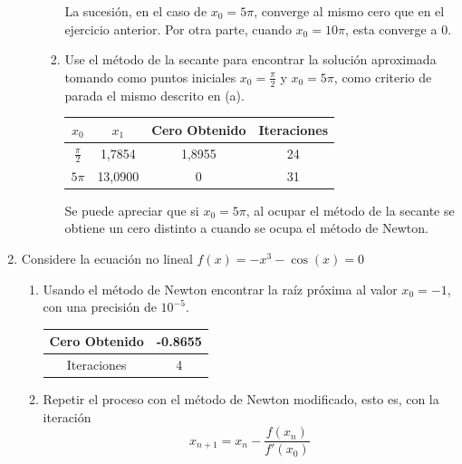 \documentclass{udpreport}
\begin{document}
\begin{enumerate}
\begin{enumerate}
\begin{enumerate}
        La sucesión, en el caso de $x_{0}=5\pi$, converge al mismo cero que en el ejercicio anterior. Por otra parte, cuando $x_{0}=10\pi$, esta converge a 0.
        
        	\item Use el método de la secante para encontrar la solución aproximada tomando como puntos iniciales $x_{0}=\frac{\pi}{2}$ y $x_{0}=5\pi$, como criterio de parada el mismo descrito en (a).
        	\begin{table} [H]
        			\centering
        			\begin{tabular}{|c|c|c|c|}
        				\hline
        				$x_{0}$& $x_{1}$ & Cero Obtenido & Iteraciones\\
        				\hline
        				$\frac{\pi}{2}$ & 1,7854 & 1,8955 & 24 \\
        				\hline 
        				$5\pi$& 13,0900 & 0 & 31\\
        				\hline
        			\end{tabular}
        		\end{table}
        		
        Se puede apreciar que si $x_{0}=5\pi$, al ocupar el método de la secante se obtiene un cero distinto a cuando se ocupa el método de Newton.	
        
        \end{enumerate}
        
    \end{enumerate}
		

\item Considere la ecuación no lineal $f(x) = -x^{3} - \cos(x) = 0$
    \begin{enumerate}
    
        \item Usando el método de Newton encontrar la raíz próxima al valor $x_{0}=-1$, con una precisión de $10^{-5}$.\\
        \begin{table}[H]
        \centering
        \begin{tabular} { |c|c|}
        
        \hline
        Cero Obtenido &  -0.8655\\
        \hline
        Iteraciones   &    4\\
        \hline
        
        \end{tabular}
        \end{table}
        
        \item Repetir el proceso con el método de Newton modificado, esto es, con la iteración $$x_{n+1} = x_{n} - \frac {f(x_{n})} {f'(x_{0})} $$
        \begin{table}[H]
        \centering
        \begin{tabular} { |c|c|}
        

\end{tabular}
\end{table}
\end{enumerate}
\end{enumerate}
\end{document}
